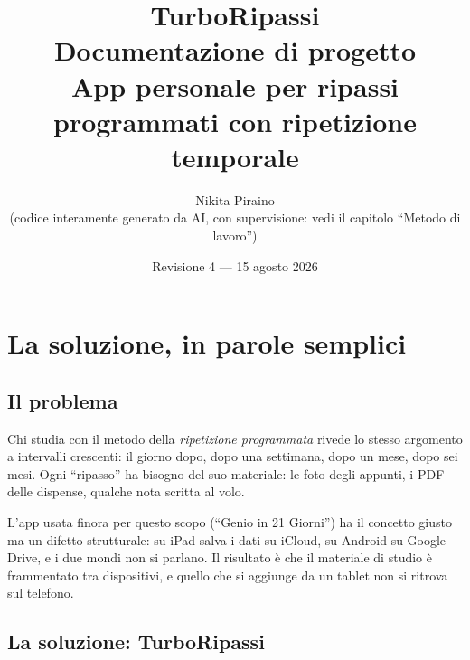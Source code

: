 \documentclass[11pt,a4paper]{report}
\title{\textbf{\textcolor{blu}{TurboRipassi}}\\[4pt]
\large Documentazione di progetto\\[2pt]
\normalsize App personale per ripassi programmati con ripetizione temporale}
\author{Nikita Piraino \\ \small (codice interamente generato da AI, con supervisione:
vedi il capitolo ``Metodo di lavoro'')}
\date{Revisione 4 --- 15 agosto 2026}
\begin{document}
\maketitle

\vspace{-0.5em}
\begin{center}
\small
{}
\end{center}

\tableofcontents

\part{La soluzione, in parole semplici}

\chapter{Il problema}

Chi studia con il metodo della \emph{ripetizione programmata} rivede lo stesso
argomento a intervalli crescenti: il giorno dopo, dopo una settimana, dopo un
mese, dopo sei mesi. Ogni ``ripasso'' ha bisogno del suo materiale: le foto
degli appunti, i PDF delle dispense, qualche nota scritta al volo.

L'app usata finora per questo scopo (``Genio in 21 Giorni'') ha il concetto
giusto ma un difetto strutturale: su iPad salva i dati su iCloud, su Android
su Google Drive, e i due mondi non si parlano. Il risultato è che il materiale
di studio è frammentato tra dispositivi, e quello che si aggiunge da un
tablet non si ritrova sul telefono.

\chapter{La soluzione: TurboRipassi}
\end{document}
